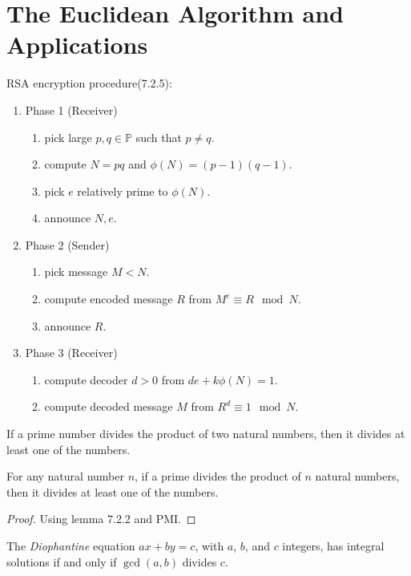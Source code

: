 \documentclass[11pt]{article}
\begin{document}
	\section{The Euclidean Algorithm and Applications}
	\par RSA encryption procedure(7.2.5):
		\begin{enumerate}
			\item Phase 1 (Receiver)
			\begin{enumerate}
				\item pick large $p, q \in \mathbb{P}$ such that $p \neq q$. 
				\item compute $N=pq$ and $\phi(N) = (p-1)(q-1)$.
				\item pick $e$ relatively prime to $\phi(N)$.
				\item announce $N, e$.
			\end{enumerate}
			\item Phase 2 (Sender)
			\begin{enumerate}
				\item pick message $M < N$.
				\item compute encoded message $R$ from $M^e \equiv R \mod N$.
				\item announce $R$.
			\end{enumerate}
			\item Phase 3 (Receiver)
			\begin{enumerate}
				\item compute decoder $d > 0$ from $de + k\phi(N) = 1$.
				\item compute decoded message $M$ from $R^d \equiv 1 \mod N$.
			\end{enumerate} 
		\end{enumerate}
		
		\begin{lemma}[7.2.2]
			If a prime number divides the product of two natural numbers, then it divides at least one of the numbers.
		\end{lemma}
		
		\begin{lemma}
			For any natural number $n$, if a prime divides the product of $n$ natural numbers, then it divides at least one of the numbers.
		\end{lemma}
		\begin{proof}
			Using lemma 7.2.2 and PMI.
		\end{proof}
		
		\begin{theorem}[7.2.8]
			The \emph{Diophantine} equation $ax+by=c$, with $a$, $b$, and $c$ integers, has integral solutions if and only if $\gcd(a,b)$ divides $c$.
		\end{theorem}
		
\end{document}
